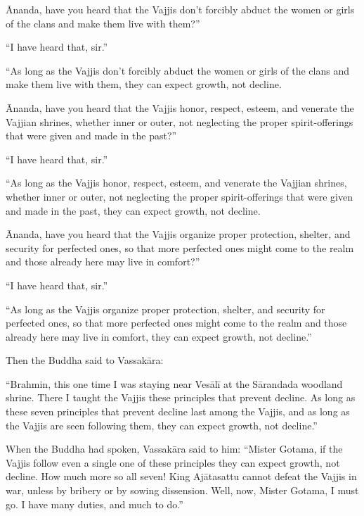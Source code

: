 \documentclass[12pt,openany]{book}%
\begin{document}
Ānanda, have you heard that the Vajjis don’t forcibly abduct the women or girls of the clans and make them live with them?” 

“I have heard that, sir.” 

“As long as the Vajjis don’t forcibly abduct the women or girls of the clans and make them live with them, they can expect growth, not decline. 

Ānanda, have you heard that the Vajjis honor, respect, esteem, and venerate the Vajjian shrines, whether inner or outer, not neglecting the proper spirit-offerings that were given and made in the past?” 

“I have heard that, sir.” 

“As long as the Vajjis honor, respect, esteem, and venerate the Vajjian shrines, whether inner or outer, not neglecting the proper spirit-offerings that were given and made in the past, they can expect growth, not decline. 

Ānanda, have you heard that the Vajjis organize proper protection, shelter, and security for perfected ones, so that more perfected ones might come to the realm and those already here may live in comfort?” 

“I have heard that, sir.” 

“As long as the Vajjis organize proper protection, shelter, and security for perfected ones, so that more perfected ones might come to the realm and those already here may live in comfort, they can expect growth, not decline.” 

Then the Buddha said to \textsanskrit{Vassakāra}: 

“Brahmin, this one time I was staying near \textsanskrit{Vesālī} at the \textsanskrit{Sārandada} woodland shrine. There I taught the Vajjis these principles that prevent decline. As long as these seven principles that prevent decline last among the Vajjis, and as long as the Vajjis are seen following them, they can expect growth, not decline.” 

When the Buddha had spoken, \textsanskrit{Vassakāra} said to him: “Mister Gotama, if the Vajjis follow even a single one of these principles they can expect growth, not decline. How much more so all seven! King \textsanskrit{Ajātasattu} cannot defeat the Vajjis in war, unless by bribery or by sowing dissension. Well, now, Mister Gotama, I must go. I have many duties, and much to do.” 
\end{document}
